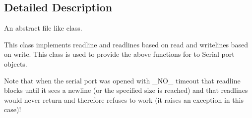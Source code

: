 \subsection{Detailed Description}
\begin{DoxyVerb}An abstract file like class.

This class implements readline and readlines based on read and
writelines based on write.
This class is used to provide the above functions for to Serial
port objects.

Note that when the serial port was opened with _NO_ timeout that
readline blocks until it sees a newline (or the specified size is
reached) and that readlines would never return and therefore
refuses to work (it raises an exception in this case)!
\end{DoxyVerb}
 

